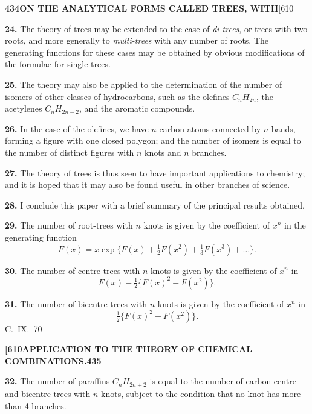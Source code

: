 \documentclass[11pt,a4paper]{book}
\begin{document}
{\newpage
\noindent\textbf{434}\hspace{\fill}\textbf{ON THE ANALYTICAL FORMS CALLED TREES, WITH}\hspace{\fill}[610

\noindent\textbf{24.}
The theory of trees may be extended to the case of \textit{di-trees}, or trees with two roots, and more generally to \textit{multi-trees} with any number of roots. The generating functions for these cases may be obtained by obvious modifications of the formulae for single trees.

\medskip
\noindent\textbf{25.}
The theory may also be applied to the determination of the number of isomers of other classes of hydrocarbons, such as the olefines $C_nH_{2n}$, the acetylenes $C_nH_{2n-2}$, and the aromatic compounds.

\medskip
\noindent\textbf{26.}
In the case of the olefines, we have $n$ carbon-atoms connected by $n$ bands, forming a figure with one closed polygon; and the number of isomers is equal to the number of distinct figures with $n$ knots and $n$ branches.

\medskip
\noindent\textbf{27.}
The theory of trees is thus seen to have important applications to chemistry; and it is hoped that it may also be found useful in other branches of science.

\medskip
\noindent\textbf{28.}
I conclude this paper with a brief summary of the principal results obtained.

\medskip
\noindent\textbf{29.}
The number of root-trees with $n$ knots is given by the coefficient of $x^n$ in the generating function
\[
F(x) = x \exp\{F(x) + \tfrac{1}{2}F(x^2) + \tfrac{1}{3}F(x^3) + \ldots\}.
\]

\medskip
\noindent\textbf{30.}
The number of centre-trees with $n$ knots is given by the coefficient of $x^n$ in
\[
F(x) - \tfrac{1}{2}\{F(x)^2 - F(x^2)\}.
\]

\medskip
\noindent\textbf{31.}
The number of bicentre-trees with $n$ knots is given by the coefficient of $x^n$ in
\[
\tfrac{1}{2}\{F(x)^2 + F(x^2)\}.
\]
\hfill C.~IX.\ 70

\newpage
\noindent\textbf{[610}\hspace{\fill}\textbf{APPLICATION TO THE THEORY OF CHEMICAL COMBINATIONS.}\hspace{\fill}\textbf{435}

\noindent\textbf{32.}
The number of paraffins $C_nH_{2n+2}$ is equal to the number of carbon centre- and bicentre-trees with $n$ knots, subject to the condition that no knot has more than 4 branches.

}
\end{document}
